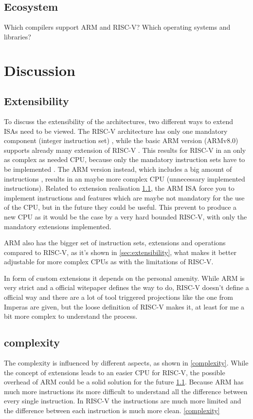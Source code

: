 \documentclass[conference]{IEEEtran}
\begin{document}
	\subsection{Ecosystem}
	Which compilers support ARM and RISC-V? Which operating systems and libraries?


\section{Discussion}
\label{ref:discussion}
	\subsection{Extensibility} \label{dis:Extensibility}
	To discuss the extensibility of the architectures, two different ways to extend \glspl{ISA} need to be viewed. The RISC-V architecture has only one mandatory component (integer instruction set) \cite{Waterman2017}, while the basic ARM version (ARMv8.0) supports already many extension of RISC-V \cite{Arm2020}. 
	This results for RISC-V in an only as complex as needed CPU, because only the mandatory instruction sets have to be implemented \cite{Waterman2017}. The ARM version instead, which includes a big amount of instructions \cite{Arm2020}, results in an maybe more complex CPU (unnecessary implemented instructions). Related to extension realisation \ref{dis:Extensibility}, the ARM \gls{ISA} force you to implement instructions and features which are maybe not mandatory for the use of the CPU, but in the future they could be useful. This prevent to produce a new CPU as it would be the case by a very hard bounded RISC-V, with only the mandatory extensions implemented. \cite{Waterman2017} \cite{Arm2020}
	
	ARM also has the bigger set of instruction sets, extensions and operations compared to RISC-V, as it's shown in \ref{sec:extensibility}, what makes it better adjustable for more complex CPUs as with the limitations of RISC-V.

	In form of custom extensions it depends on the personal amenity. While ARM is very strict and a official witepaper \cite{LauranneChoquin2020} defines the way to do, RISC-V doesn't define a official way and there are a lot of tool triggered projections like the one from Imperas \cite{Limited2019} are given, but the loose definition of RISC-V makes it, at least for me a bit more complex to understand the process.
	
	\subsection{complexity}
The complexity is influenced by different aspects, as shown in \ref{complexity}.
While the concept of extensions leads to an easier CPU for RISC-V, the possible overhead of ARM could be a solid solution for the future \ref{dis:Extensibility}.
	Because ARM has much more instructions its more difficult to understand all the difference between every single instruction. In RISC-V the instructions are much more limited and the difference between each instruction is much more clean. \ref{complexity}
	
\end{document}
